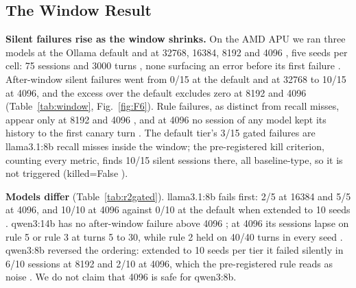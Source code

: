 \documentclass[conference,10pt]{IEEEtran}
\begin{document}
\subsection{The Window Result}\label{sec:4.6a}

\textbf{Silent failures rise as the window shrinks.} On the AMD APU we ran three models at the Ollama default and at 32768, 16384, 8192 and 4096%
, five seeds per cell: 75 sessions and 3000 turns%
, none surfacing an error before its first failure%
. After-window silent failures went from 0/15 at the default and at 32768 to 10/15 at 4096, and the excess over the default excludes zero at 8192 and 4096 %
(Table~\ref{tab:window}, Fig.~\ref{fig:F6}). Rule failures, as distinct from recall misses, appear only at 8192 and 4096%
, and at 4096 no session of any model kept its history to the first canary turn%
. The default tier's 3/15 gated failures %
are llama3.1:8b recall misses inside the window; the pre-registered kill criterion, counting every metric, finds 10/15 silent sessions there, all baseline-type, so it is not triggered (killed=False%
).

\textbf{Models differ} (Table~\ref{tab:r2gated}). llama3.1:8b fails first: 2/5 at 16384 %
and 5/5 at 4096, and 10/10 at 4096 against 0/10 at the default when extended to 10 seeds%
. qwen3:14b has no after-window failure above 4096%
; at 4096 its sessions lapse on rule 5 or rule 3 at turns 5 to 30, while rule 2 held on 40/40 turns in every seed%
. qwen3:8b reversed the ordering: extended to 10 seeds per tier it failed silently in 6/10 sessions at 8192 and 2/10 at 4096, which the pre-registered rule reads as noise%
. We do not claim that 4096 is safe for qwen3:8b.
\end{document}
